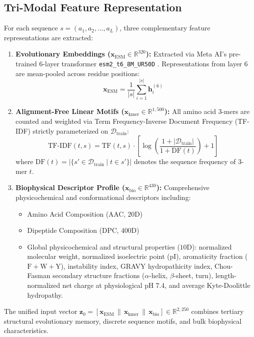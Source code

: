 \documentclass[journal]{IEEEtran}
\begin{document}
\subsection{Tri-Modal Feature Representation}
For each sequence $s = (a_1, a_2, \dots, a_L)$, three complementary feature representations are extracted:
\begin{enumerate}
    \item \textbf{Evolutionary Embeddings ($\mathbf{x}_{\text{ESM}} \in \mathbb{R}^{320}$):} Extracted via Meta AI's pre-trained $6$-layer transformer \texttt{esm2\_t6\_8M\_UR50D} \cite{lin2023evolutionary}. Representations from layer $6$ are mean-pooled across residue positions:
    \begin{equation}
    \mathbf{x}_{\text{ESM}} = \frac{1}{|s|} \sum_{i=1}^{|s|} \mathbf{h}_i^{(6)}
    \end{equation}
    \item \textbf{Alignment-Free Linear Motifs ($\mathbf{x}_{\text{kmer}} \in \mathbb{R}^{1,500}$):} All amino acid $3$-mers are counted and weighted via Term Frequency-Inverse Document Frequency (TF-IDF) strictly parameterized on $\mathcal{D}_{\text{train}}$:
    \begin{equation}
    \text{TF-IDF}(t, s) = \text{TF}(t, s) \cdot \left[\log \left( \frac{1 + |\mathcal{D}_{\text{train}}|}{1 + \text{DF}(t)} \right) + 1\right]
    \end{equation}
    where $\text{DF}(t) = |\{s' \in \mathcal{D}_{\text{train}} \mid t \in s'\}|$ denotes the sequence frequency of $3$-mer $t$.
    \item \textbf{Biophysical Descriptor Profile ($\mathbf{x}_{\text{bio}} \in \mathbb{R}^{430}$):} Comprehensive physicochemical and conformational descriptors including:
    \begin{itemize}
        \item Amino Acid Composition (AAC, $20\text{D}$)
        \item Dipeptide Composition (DPC, $400\text{D}$)
        \item Global physicochemical and structural properties ($10\text{D}$): normalized molecular weight, normalized isoelectric point ($\text{pI}$), aromaticity fraction ($\text{F}+\text{W}+\text{Y}$), instability index, GRAVY hydropathicity index, Chou-Fasman secondary structure fractions ($\alpha$-helix, $\beta$-sheet, turn), length-normalized net charge at physiological pH 7.4, and average Kyte-Doolittle hydropathy.
    \end{itemize}
\end{enumerate}
The unified input vector $\mathbf{z}_0 = [\mathbf{x}_{\text{ESM}} \,\|\, \mathbf{x}_{\text{kmer}} \,\|\, \mathbf{x}_{\text{bio}}] \in \mathbb{R}^{2,250}$ combines tertiary structural evolutionary memory, discrete sequence motifs, and bulk biophysical characteristics.
\end{document}
